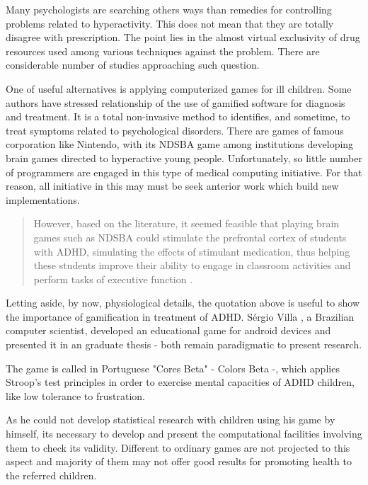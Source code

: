 Many psychologists are searching others ways than remedies for controlling problems related to hyperactivity. This does not mean that they are totally disagree with prescription. The point lies in the almost virtual exclusivity of drug resources used among various techniques against the problem. There are considerable number of studies approaching such question.

One of useful alternatives is applying computerized games for ill children. Some authors have stressed relationship of the use of gamified software for diagnosis and treatment. It is a total non-invasive method to identifies, and sometime, to treat symptoms related to psychological disorders. There are games of famous corporation like Nintendo, with its NDSBA game among institutions developing brain games directed to hyperactive young people. Unfortunately, so little number of programmers are engaged in this type of medical computing initiative. For that reason, all initiative in this may must be seek anterior work which build new implementations. 

\begin{quote}
However, based on the literature, it seemed feasible that playing brain games such as NDSBA could stimulate the prefrontal cortex of students with ADHD, simulating the effects of stimulant medication, thus helping these students improve their ability to engage in classroom activities and perform tasks of executive function \citep{brainGames}. 
\end{quote}

Letting aside, by now, physiological details, the quotation above is useful to show the importance of gamification in treatment of ADHD. S\'{e}rgio Villa \citeyearpar{Villa}, a Brazilian computer scientist, developed an educational game for android devices and presented it in an graduate thesis - both remain paradigmatic to present research.

The game is called in Portuguese "Cores Beta" - Colors Beta -, which applies Stroop's test principles in order to exercise mental capacities of ADHD children, like low tolerance to frustration. 

As he could not develop statistical research with children using his game by himself, its necessary to develop and present the computational facilities involving them to check its validity. Different to ordinary games are not projected to this aspect and majority of them may not offer good results for promoting health to the referred children. 

